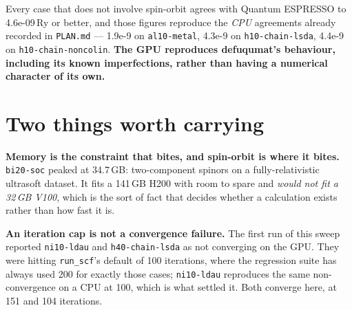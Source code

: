 \documentclass[11pt,a4paper]{article}
\begin{document}
Every case that does not involve spin-orbit agrees with Quantum ESPRESSO to
4.6e-09\,Ry or better, and those figures reproduce the \emph{CPU} agreements
already recorded in \texttt{PLAN.md} --- 1.9e-9 on \texttt{al10-metal}, 4.3e-9 on
\texttt{h10-chain-lsda}, 4.4e-9 on \texttt{h10-chain-noncolin}. \textbf{The GPU
reproduces defuqumat's behaviour, including its known imperfections, rather than
having a numerical character of its own.}

\section*{Two things worth carrying}

\textbf{Memory is the constraint that bites, and spin-orbit is where it bites.}
\texttt{bi20-soc} peaked at 34.7\,GB: two-component spinors on a
fully-relativistic ultrasoft dataset. It fits a 141\,GB H200 with room to spare
and \emph{would not fit a 32\,GB V100}, which is the sort of fact that decides
whether a calculation exists rather than how fast it is.

\textbf{An iteration cap is not a convergence failure.} The first run of this
sweep reported \texttt{ni10-ldau} and \texttt{h40-chain-lsda} as not converging
on the GPU. They were hitting \texttt{run\_scf}'s default of 100 iterations,
where the regression suite has always used 200 for exactly those cases;
\texttt{ni10-ldau} reproduces the same non-convergence on a CPU at 100, which is
what settled it. Both converge here, at 151 and 104 iterations.
\end{document}
